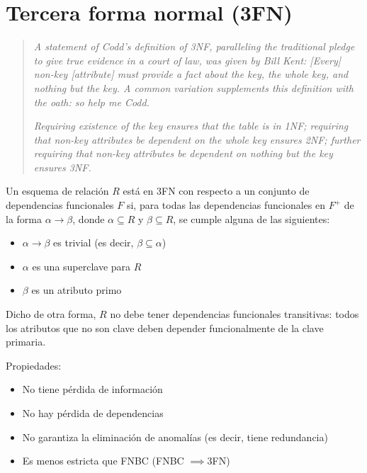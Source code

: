\documentclass[a4paper, twoside]{article}
\begin{document}
\section{Tercera forma normal (3FN)}
\begin{quote}
	\emph{A statement of Codd's definition of 3NF, paralleling the traditional pledge to give true evidence in a court of law, was given by Bill Kent: [Every] non-key [attribute] must provide a fact about the key, the whole key, and nothing but the key. A common variation supplements this definition with the oath: so help me Codd.}

	\emph{Requiring existence of the key ensures that the table is in 1NF; requiring that non-key attributes be dependent on the whole key ensures 2NF; further requiring that non-key attributes be dependent on nothing but the key ensures 3NF.}
\end{quote}

Un esquema de relación $R$ está en 3FN con respecto a un conjunto de dependencias funcionales $F$ si, para todas las dependencias funcionales en $F^{+}$ de la forma $\alpha \to \beta$, donde $\alpha \subseteq R$ y $\beta \subseteq R$, se cumple alguna de las siguientes:
\begin{itemize}
	\item $\alpha\to\beta$ es trivial (es decir, $\beta\subseteq\alpha$)
	\item $\alpha$ es una superclave para $R$ 
	\item $\beta$ es un atributo primo
\end{itemize}

Dicho de otra forma, $R$ no debe tener dependencias funcionales transitivas: todos los atributos que no son clave deben depender funcionalmente de la clave primaria.

Propiedades:
\begin{itemize}
	\item No tiene pérdida de información
	\item No hay pérdida de dependencias
	\item No garantiza la eliminación de anomalías (es decir, tiene redundancia)
	\item Es menos estricta que FNBC (FNBC $\implies$3FN)
\end{itemize}
\end{document}
